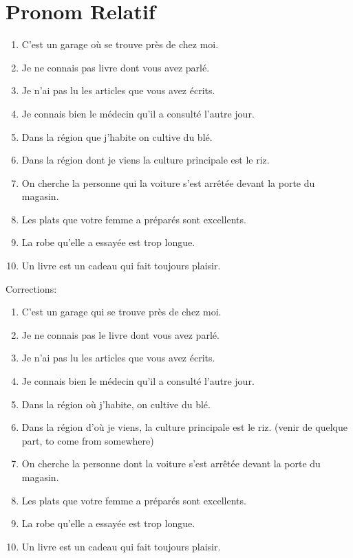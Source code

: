\documentclass{book}
\begin{document}
    \section{Pronom Relatif}
        \begin{enumerate}
            \item C'est un garage où se trouve près de chez moi.
            \item Je ne connais pas livre dont vous avez parlé.
            \item Je n'ai pas lu les articles que vous avez écrits.
            \item Je connais bien le médecin qu'il a consulté l'autre jour.
            \item Dans la région que j'habite on cultive du blé.
            \item Dans la région dont je viens la culture principale est le riz.
            \item On cherche la personne qui la voiture s'est arrêtée devant la porte du magasin.
            \item Les plats que votre femme a préparés sont excellents.
            \item La robe qu'elle a essayée est trop longue.
            \item Un livre est un cadeau qui fait toujours plaisir.
        \end{enumerate}
        Corrections:
        \begin{enumerate}
            \item C'est un garage qui se trouve près de chez moi.
            \item Je ne connais pas le livre dont vous avez parlé.
            \item Je n'ai pas lu les articles que vous avez écrits.
            \item Je connais bien le médecin qu'il a consulté l'autre jour.
            \item Dans la région où j'habite, on cultive du blé.
            \item Dans la région d'où je viens, la culture principale est le riz. (venir de quelque part, to come from somewhere)
            \item On cherche la personne dont la voiture s'est arrêtée devant la porte du magasin.
            \item Les plats que votre femme a préparés sont excellents.
            \item La robe qu'elle a essayée est trop longue.
            \item Un livre est un cadeau qui fait toujours plaisir.
        \end{enumerate}
\end{document}
